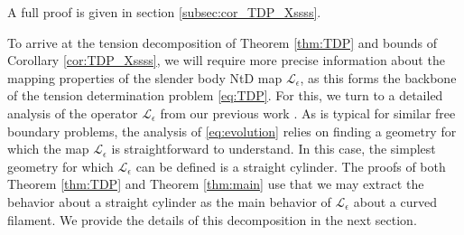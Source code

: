 \documentclass[11pt,reqno]{amsart}
\newcommand{\mc}[1]{\mathcal{#1}}
\theoremstyle{definition}
\begin{document}
%
%
%
A full proof is given in section \ref{subsec:cor_TDP_Xssss}.



To arrive at the tension decomposition of Theorem \ref{thm:TDP} and bounds of Corollary \ref{cor:TDP_Xssss}, we will require more precise information about the mapping properties of the slender body NtD map $\mc{L}_\epsilon$, as this forms the backbone of the tension determination problem \eqref{eq:TDP}. 
For this, we turn to a detailed analysis of the operator $\mc{L}_\epsilon$ from our previous work \cite{ohm2024free,ohm2025angle}. As is typical for similar free boundary problems, the analysis of \eqref{eq:evolution} relies on finding a geometry for which the map $\mc{L}_\epsilon$ is straightforward to understand. In this case, the simplest geometry for which $\mc{L}_\epsilon$ can be defined is a straight cylinder. The proofs of both Theorem \ref{thm:TDP} and Theorem \ref{thm:main} use that we may extract the behavior about a straight cylinder as the main behavior of $\mc{L}_\epsilon$ about a curved filament. We provide the details of this decomposition in the next section. 


\end{document}
